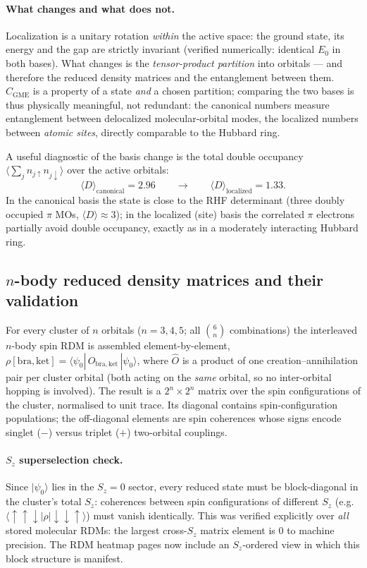 \documentclass[11pt]{article}
\newcommand{\CGME}{\ensuremath{C_{\mathrm{GME}}}}
\begin{document}
\paragraph{What changes and what does not.}
Localization is a unitary rotation \emph{within} the active space: the ground
state, its energy and the gap are strictly invariant (verified numerically:
identical $E_0$ in both bases). What changes is the \emph{tensor-product
partition} into orbitals --- and therefore the reduced density matrices and the
entanglement between them. \CGME{} is a property of a state \emph{and} a chosen
partition; comparing the two bases is thus physically meaningful, not
redundant: the canonical numbers measure entanglement between delocalized
molecular-orbital modes, the localized numbers between \emph{atomic sites},
directly comparable to the Hubbard ring.

A useful diagnostic of the basis change is the total double occupancy
$\langle\sum_j n_{j\uparrow}n_{j\downarrow}\rangle$ over the active orbitals:
\[
  \langle D\rangle_{\mathrm{canonical}} = 2.96 \qquad\longrightarrow\qquad
  \langle D\rangle_{\mathrm{localized}} = 1.33 .
\]
In the canonical basis the state is close to the RHF determinant (three doubly
occupied $\pi$ MOs, $\langle D\rangle\!\approx\!3$); in the localized (site)
basis the correlated $\pi$ electrons partially avoid double occupancy, exactly
as in a moderately interacting Hubbard ring.

\subsection{$n$-body reduced density matrices and their validation}
For every cluster of $n$ orbitals ($n=3,4,5$; all $\binom{6}{n}$ combinations)
the interleaved $n$-body spin RDM is assembled element-by-element,
$\rho[\mathrm{bra},\mathrm{ket}]
 =\langle\psi_0|\,\hat O_{\mathrm{bra,ket}}\,|\psi_0\rangle$,
where $\hat O$ is a product of one creation--annihilation pair per cluster
orbital (both acting on the \emph{same} orbital, so no inter-orbital hopping is
involved). The result is a $2^n\times2^n$ matrix over the spin configurations
of the cluster, normalised to unit trace. Its diagonal contains spin-configuration
populations; the off-diagonal elements are spin coherences whose signs encode
singlet ($-$) versus triplet ($+$) two-orbital couplings.

\paragraph{$S_z$ superselection check.}
Since $|\psi_0\rangle$ lies in the $S_z=0$ sector, every reduced state must be
block-diagonal in the cluster's total $S_z$: coherences between spin
configurations of different $S_z$ (e.g.\
$\langle\!\uparrow\uparrow\downarrow\!|\rho|\!\downarrow\downarrow\uparrow\!\rangle$)
must vanish identically. This was verified explicitly over \emph{all} stored
molecular RDMs: the largest cross-$S_z$ matrix element is $0$ to machine
precision. The RDM heatmap pages now include an $S_z$-ordered view in which
this block structure is manifest.
\end{document}
